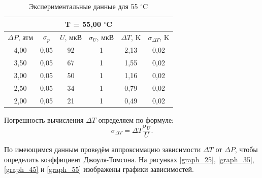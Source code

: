 \documentclass[a4paper, 12pt]{article}
\begin{document}
    \begin{table}[H]
	\centering
        \begin{tabular}{|cccccc|}
            \hline
            \multicolumn{6}{|c|}{T = 55,00 $^\circ$C} \\ \hline
            \multicolumn{1}{|c|}{$\Delta P$, атм} & \multicolumn{1}{c|}{$\sigma_p$} & \multicolumn{1}{c|}{$U$, мкВ} & \multicolumn{1}{c|}{$\sigma_U$, мкВ} & \multicolumn{1}{c|}{$\Delta T$, K} & $\sigma_{\Delta T}$, K \\ \hline
            \multicolumn{1}{|c|}{4,00} & \multicolumn{1}{c|}{0,05} & \multicolumn{1}{c|}{92} & \multicolumn{1}{c|}{1} & \multicolumn{1}{c|}{2,13} & 0,02 \\ \hline
            \multicolumn{1}{|c|}{3,50} & \multicolumn{1}{c|}{0,05} & \multicolumn{1}{c|}{67} & \multicolumn{1}{c|}{1} & \multicolumn{1}{c|}{1,55} & 0,02 \\ \hline
            \multicolumn{1}{|c|}{3,00} & \multicolumn{1}{c|}{0,05} & \multicolumn{1}{c|}{50} & \multicolumn{1}{c|}{1} & \multicolumn{1}{c|}{1,16} & 0,02 \\ \hline
            \multicolumn{1}{|c|}{2,50} & \multicolumn{1}{c|}{0,05} & \multicolumn{1}{c|}{34} & \multicolumn{1}{c|}{1} & \multicolumn{1}{c|}{0,79} & 0,02 \\ \hline
            \multicolumn{1}{|c|}{2,00} & \multicolumn{1}{c|}{0,05} & \multicolumn{1}{c|}{21} & \multicolumn{1}{c|}{1} & \multicolumn{1}{c|}{0,49} & 0,02 \\ \hline
        \end{tabular}
	\caption{Экспериментальные данные для 55 $^\circ$C}
	\label{tab:55C}
    \end{table}
    
    \noindent Погрешность вычисления $\Delta T$ определяем по формуле: \[ \sigma_{\Delta T} = \Delta T \frac{\sigma_U}{U}. \]

    \noindent По имеющимся данным проведём аппроксимацию зависимости $\Delta T$ от $\Delta P$, чтобы определить коэффициент Джоуля-Томсона. На рисунках \ref{graph_25}, \ref{graph_35}, \ref{graph_45} и \ref{graph_55} изображены графики зависимостей.
\end{document}
